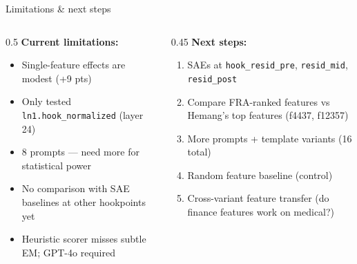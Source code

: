 \documentclass[aspectratio=169]{beamer}
\begin{document}
\begin{frame}{Limitations \& next steps}
\begin{columns}
\begin{column}{0.5\textwidth}
\textbf{Current limitations:}
\begin{itemize}
    \item Single-feature effects are modest (+9 pts)
    \item Only tested \texttt{ln1.hook\_normalized} (layer 24)
    \item 8 prompts --- need more for statistical power
    \item No comparison with SAE baselines at other hookpoints yet
    \item Heuristic scorer misses subtle EM; GPT-4o required
\end{itemize}
\end{column}
\begin{column}{0.45\textwidth}
\textbf{Next steps:}
\begin{enumerate}
    \item SAEs at \texttt{hook\_resid\_pre}, \texttt{resid\_mid}, \texttt{resid\_post}
    \item Compare FRA-ranked features vs Hemang's top features (f4437, f12357)
    \item More prompts + template variants (16 total)
    \item Random feature baseline (control)
    \item Cross-variant feature transfer (do finance features work on medical?)
\end{enumerate}
\end{column}
\end{columns}
\end{frame}
\end{document}
